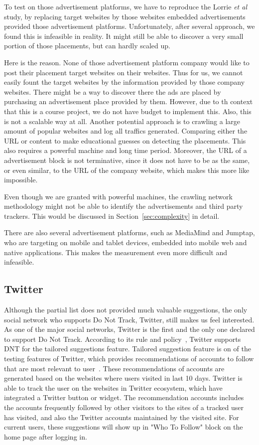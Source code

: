 \documentclass{sig-alternate}
\begin{document}
To test on those advertisement platforms, we have to reproduce the Lorrie \emph{et al} study, by replacing target websites by those websites embedded advertisements provided those advertisement platforms. Unfortunately, after several approach, we found this is infeasible in reality. It might still be able to discover a very small portion of those placements, but can hardly scaled up.

Here is the reason. None of those advertisement platform company would like to post their placement target websites on their websites. Thus for us, we cannot easily fount the target websites by the information provided by those company websites. There might be a way to discover there the ads are placed by purchasing an advertisement place provided by them. However, due to th context that this is a course project, we do not have budget to implement this. Also, this is not a scalable way at all. Another potential approach is to crawling a large amount of popular websites and log all traffics generated. Comparing either the URL or content to make educational guesses on detecting the placements. This also requires a powerful machine and long time period. Moreover, the URL of a advertisement block is not terminative, since it does not have to be as the same, or even similar, to the URL of the company website, which makes this more like impossible.

Even though we are granted with powerful machines, the crawling network methodology might not be able to identify the advertisements and third party trackers. This would be discussed in Section~\ref{sec:complexity} in detail.

There are also several advertisement platforms, such as MediaMind and Jumptap, who are targeting on mobile and tablet devices, embedded into mobile web and native applications. This makes the measurement even more difficult and infeasible.

\subsection{Twitter}

Although the partial list does not provided much valuable suggestions, the only social network who supports Do Not Track, Twitter, still makes us feel interested. As one of the major social networks, Twitter is the first and the only one declared to support Do Not Track. According to its rule and policy~\cite{twitterdnt}, Twitter supports DNT for the tailored suggestions feature. Tailored suggestion feature is on of the testing features of Twitter, which provides recommendations of accounts to follow that are most relevant to user~\cite{twitterfaq}. These recommendations of accounts are generated based on the websites where users visited in last 10 days. Twitter is able to track the user on the websites in Twitter ecosystem, which have integrated a Twitter button or widget. The recommendation accounts includes the accounts frequently followed by other visitors to the sites of a tracked user has visited, and also the Twitter accounts maintained by the visited site. For current users, these suggestions will show up in "Who To Follow" block on the home page after logging in.
\end{document}
